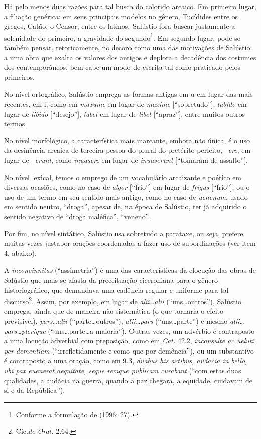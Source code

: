  Há pelo menos duas razões para tal busca do colorido arcaico. Em primeiro lugar, a filiação genérica: em seus principais modelos no gênero, Tucídides entre os gregos, Catão, o Censor, entre os latinos, Salústio fora buscar justamente a solenidade do primeiro, a gravidade do segundo\footnote{Conforme a formulação de  (1996: 27).}. Em segundo lugar, pode-se também pensar, retoricamente, no decoro como uma das motivações de Salústio: a uma obra que exalta os valores dos antigos e deplora a decadência dos costumes dos contemporâneos, bem cabe um modo de escrita tal como praticado pelos primeiros. 

No nível ortográfico, Salústio emprega as formas antigas em u em
lugar das mais recentes, em i, como em \emph{maxume} em lugar de \emph{maxime}
[“sobretudo”], \emph{lubido} em lugar de \emph{libido} [“desejo”], \emph{lubet}
em lugar de \emph{libet} [“apraz”], entre muitos outros termos. 

No nível
morfológico, a característica  mais marcante, embora não única, é o uso da desinência arcaica de terceira pessoa do plural do
pretérito perfeito, \emph{–ere}, em lugar de \emph{–erunt}, como
\emph{inuasere} em lugar de \emph{inuaserunt} [“tomaram de assalto”].

No nível lexical, temos o
emprego de um vocabulário arcaizante e poético em diversas ocasiões, como no
caso de \emph{algor} [“frio”] em lugar de \emph{frigus} [“frio”],
ou o uso de um termo em seu sentido mais antigo, como no caso de
\emph{uenenum}, usado em sentido neutro, “droga”, apesar de, na época de
Salústio, ter já adquirido o sentido negativo de “droga maléfica”, “veneno”.


Por fim, no nível sintático, Salústio usa sobretudo a parataxe, ou seja, prefere muitas vezes justapor orações coordenadas a fazer uso de subordinações (ver item 4, abaixo).


A \emph{inconcinnitas} (“assimetria”) é uma das
características da elocução das obras de Salústio que mais se afasta da
preceituação ciceroniana para o gênero historiográfico, que demandava uma
cadência regular e uniforme para tal discurso\footnote{Cic.\emph{de Orat.} 2.64.}.  Assim, por
exemplo, em lugar de \emph{alii\dots alii} (“uns\ldots outros”), Salústio
emprega, ainda que de maneira não sistemática (o que tornaria o efeito
previsível), \emph{pars\dots alii} (“parte\dots outros”), \emph{alii\ldots{}pars}
(“uns\ldots parte”) e mesmo \emph{alii\dots pars\dots plerique}
(“uns\ldots{}parte\ldots{}a maioria”). Outras vezes, um advérbio é contraposto a uma locução adverbial com
preposição, como em \emph{Cat.} 42.2, \emph{inconsulte ac ueluti per dementiam}
(“irrefletidamente e como que por demência”), ou um substantivo é contraposto a
uma oração, como em 9.3, \emph{duabus his artibus, audacia in bello, ubi pax
euenerat aequitate, seque remque publicam curabant} (“com estas duas
qualidades, a audácia na guerra, quando a paz chegara, a equidade, cuidavam de
si e da República”).

